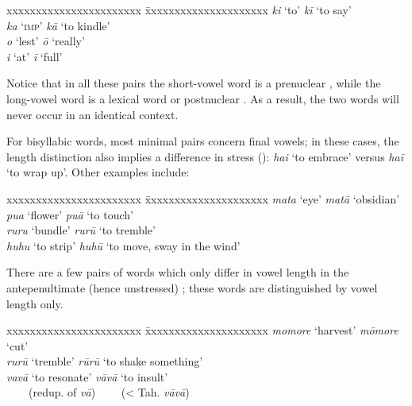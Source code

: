 \ea
\begin{tabbing}
 xxxxxxxxxxxxxxxxxxxxxxx \= xxxxxxxxxxxxxxxxxxxxx \kill
  \textit{ki}  ‘to’ \> \textit{kī}  ‘to say’\\
  \textit{ka}  ‘\textsc{imp}’ \> \textit{kā}  ‘to kindle’\\
\textit{{\ꞌ}o}  ‘lest’ \> \textit{{\ꞌ}ō}  ‘really’\\
 \textit{{\ꞌ}i}  ‘at’ \> \textit{{\ꞌ}ī}  ‘full’
\end{tabbing}
\z
Notice that in all these pairs the short-vowel word is a prenuclear , while the long-vowel word is a lexical word or postnuclear . As a result, the two words will never occur in an identical context.

For bisyllabic words, most minimal pairs concern final vowels; in these cases, the length distinction also implies a difference in stress (): \textit{ha{\ꞌ}i}  ‘to embrace’ versus \textit{ha{\ꞌ}ī}  ‘to wrap up’. Other examples include:

\ea
\begin{tabbing}
 xxxxxxxxxxxxxxxxxxxxxxx \= xxxxxxxxxxxxxxxxxxxxx \kill
  \textit{mata}  ‘eye’   \> \textit{matā}  ‘obsidian’\\
  \textit{pua}  ‘flower’   \> \textit{puā}  ‘to touch’\\
  \textit{ruru}  ‘bundle’   \> \textit{rurū}  ‘to tremble’\\
  \textit{huhu}  ‘to strip’  \>  \textit{huhū}  ‘to move, sway in the wind’
\end{tabbing}
\z
There are a few pairs of words which only differ in vowel length in the antepenultimate (hence unstressed) ; these words are distinguished by vowel length only.

\ea
\begin{tabbing}
 xxxxxxxxxxxxxxxxxxxxxxx \= xxxxxxxxxxxxxxxxxxxxx \kill
  \textit{momore}  ‘harvest’   \>  \textit{mōmore}  ‘cut’\\
   \textit{rurū}  ‘tremble’  \>  \textit{rūrū}  ‘to shake something’\\
  \textit{vavā}  ‘to resonate’  \>  \textit{vāvā}  ‘to insult’\\
    ~~~~(redup. of \textit{vā})     \>     ~~~~({\textless} Tah. \textit{vāvā})
\end{tabbing}
\z 
